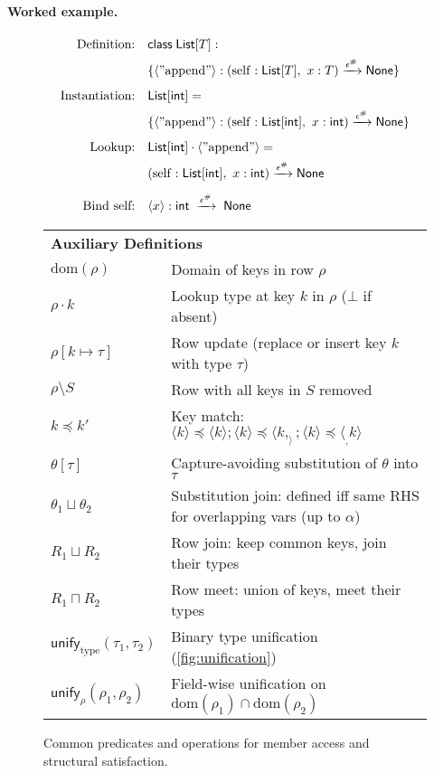 \paragraph{Worked example.}
\[
\begin{aligned}
\text{Definition:} \quad & \mathsf{class}\; \mathsf{List}[T] :
\\ & \{\langle \mathrm{"append"} \rangle : (\mathrm{self}:\mathsf{List}[T],\ x:T) \xrightarrow{\epsilon^\#} \mathsf{None} \} \\[0.5em]
\text{Instantiation:} \quad & \mathsf{List}[\mathsf{int}] =
\\ & \{\langle \mathrm{"append"} \rangle : (\mathrm{self}:\mathsf{List}[\mathsf{int}],\ x:\mathsf{int}) \xrightarrow{\epsilon^\#} \mathsf{None} \} \\[0.5em]
\text{Lookup:} \quad & \mathsf{List}[\mathsf{int}] \cdot \langle \mathrm{"append"} \rangle =
\\ & (\mathrm{self}:\mathsf{List}[\mathsf{int}],\ x:\mathsf{int}) \xrightarrow{\epsilon^\#} \mathsf{None} \\[0.5em]
\text{Bind self:} \quad & \langle x\rangle:\mathsf{int} \;\xrightarrow{\epsilon^\#}\; \mathsf{None}
\end{aligned}
\]

\begin{figure}[t]
\centering
\renewcommand{\arraystretch}{1.2}
\begin{tabular}{l l}
\multicolumn{2}{l}{\textbf{Auxiliary Definitions}} \\[0.3em]
$\mathrm{dom}(\rho)$ & Domain of keys in row $\rho$ \\
$\rho \cdot k$ & Lookup type at key $k$ in $\rho$ ($\bot$ if absent) \\
$\rho[k \mapsto \tau]$ & Row update (replace or insert key $k$ with type $\tau$) \\
$\rho \setminus S$ & Row with all keys in $S$ removed \\
$k \preccurlyeq k'$ & Key match: $\langle k \rangle \preccurlyeq \langle k \rangle; \langle k \rangle \preccurlyeq \langle k, _ \rangle; \langle k \rangle \preccurlyeq \langle _, k \rangle$ \\
$\theta[\tau]$ & Capture-avoiding substitution of $\theta$ into $\tau$ \\
$\theta_1 \sqcup \theta_2$ & Substitution join: defined iff same RHS for overlapping vars (up to $\alpha$) \\
$R_1 \sqcup R_2$ & Row join: keep common keys, join their types \\
$R_1 \sqcap R_2$ & Row meet: union of keys, meet their types \\
$\mathsf{unify}_{\mathrm{type}}(\tau_1,\tau_2)$ & Binary type unification (\autoref{fig:unification}) \\
$\mathsf{unify}_{\rho}(\rho_1,\rho_2)$ & Field-wise unification on $\mathrm{dom}(\rho_1) \cap \mathrm{dom}(\rho_2)$
\end{tabular}
\caption{Common predicates and operations for member access and structural satisfaction.}
\label{fig:auxiliary-defs}
\end{figure}


